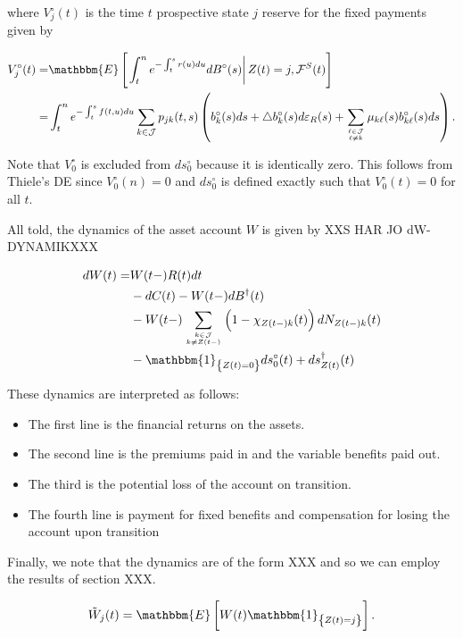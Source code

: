 \documentclass{book}
\newcommand{\1}[1]{\mathbbm{1}_{\left\lbrace #1 \right\rbrace}}
\newcommand{\expec}[1][def]{\mathbbm{E} \left[ #1 \right]}
\newcommand{\econd}[2][def]{\mathbbm{E} \left[ \left. #1 \right| #2 \right]}
\theoremstyle{break}
\theoremstyle{remark}
\numberwithin{equation}{section}
\begin{document}
where $V_j^\circ(t)$ is the time $t$ prospective state $j$ reserve for the fixed payments given by

\begin{align*}
    V_j^\circ(t) =& \econd[\int_t^n e^{-\int_t^s r(u) du} dB^\circ(s)]{Z(t)=j,\mathcal{F}^S(t)} \\
    =& \int_t^n e^{-\int_t^s f(t,u) du} \sum_{k \in \mathcal{J}} p_{jk}(t,s) \left( b_k^\circ(s)ds + \triangle b_k^\circ(s) d\varepsilon_R(s) + \sum_{\ell \in \mathcal{J} \atop \ell \neq k} \mu_{k \ell}(s) b_{k \ell}^\circ(s) ds \right).
\end{align*}

Note that $V_0^\circ$ is excluded from $ds_0^\circ$ because it is identically zero. This follows from Thiele's DE since $V_0^\circ(n)=0$ and $ds_0^\circ$ is defined exactly such that $V_0^\circ(t)=0$ for all $t$.

All told, the dynamics of the asset account $W$ is given by XXS HAR JO dW-DYNAMIKXXX

\begin{align}
    dW(t) =& W(t-) R(t) dt \\
    &- dC(t) - W(t-) dB^\dagger(t) \\
    &- W(t-) \sum_{k \in \mathcal{J} \atop k \neq Z(t-)} \left( 1 - \chi_{Z(t-)k}(t) \right) dN_{Z(t-)k}(t) \\
    &- \1{Z(t)=0} ds_0^\circ(t) + ds_{Z(t)}^\dagger(t)
\end{align}

These dynamics are interpreted as follows:

\begin{itemize}
    \item The first line is the financial returns on the assets.
    \item The second line is the premiums paid in and the variable benefits paid out.
    \item The third is the potential loss of the account on transition.
    \item The fourth line is payment for fixed benefits and compensation for losing the account upon transition
\end{itemize}

Finally, we note that the dynamics are of the form XXX and so we can employ the results of section XXX.

\begin{align*}
    \tilde{W}_j(t) = \expec[W(t) \1{Z(t)=j}].
\end{align*}
\end{document}
